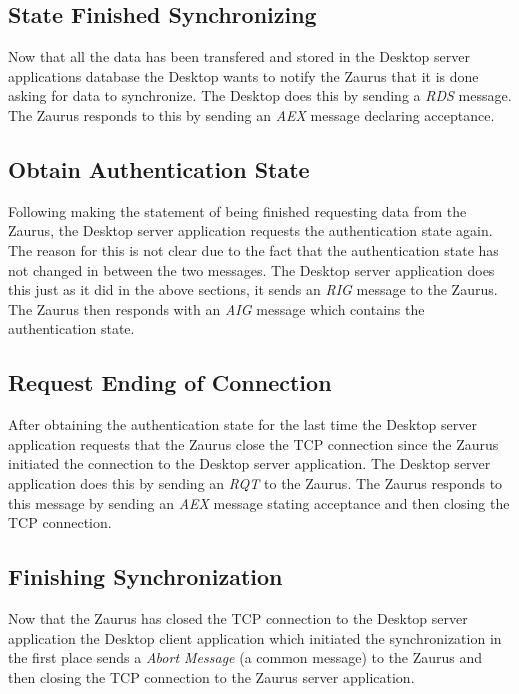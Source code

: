     \subsection{State Finished Synchronizing}
    Now that all the data has been transfered and stored in the Desktop
    server applications database the Desktop wants to notify the Zaurus that
    it is done asking for data to synchronize. The Desktop does this by
    sending a \emph{RDS} message. The Zaurus responds to this by sending an
    \emph{AEX} message declaring acceptance.

    \subsection{Obtain Authentication State}
    Following making the statement of being finished requesting data from the
    Zaurus, the Desktop server application requests the authentication state
    again. The reason for this is not clear due to the fact that the
    authentication state has not changed in between the two messages. The
    Desktop server application does this just as it did in the above sections,
    it sends an \emph{RIG} message to the Zaurus. The Zaurus then responds
    with an \emph{AIG} message which contains the authentication state.

    \subsection{Request Ending of Connection}
    After obtaining the authentication state for the last time the Desktop
    server application requests that the Zaurus close the TCP connection since
    the Zaurus initiated the connection to the Desktop server application. The
    Desktop server application does this by sending an \emph{RQT} to the
    Zaurus. The Zaurus responds to this message by sending an \emph{AEX}
    message stating acceptance and then closing the TCP connection.

    \subsection{Finishing Synchronization}
    Now that the Zaurus has closed the TCP connection to the Desktop server
    application the Desktop client application which initiated the
    synchronization in the first place sends a \emph{Abort Message} (a common
    message) to the Zaurus and then closing the TCP connection to the Zaurus
    server application.

